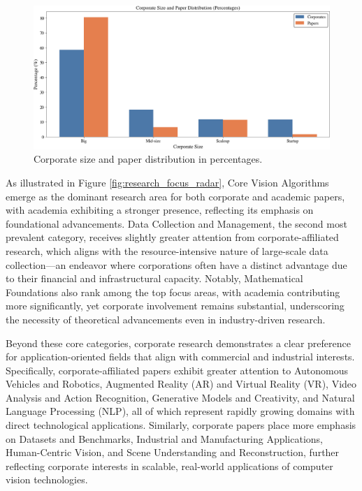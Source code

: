 \documentclass{article}
\begin{document}
\begin{figure}[ht]
  \centering
  \includegraphics[width=\textwidth]{report/images/corporate_paper_distribution.png}  
  \caption{Corporate size and paper distribution in percentages.}
  \label{fig:corporate_size_graph}
\end{figure}

As illustrated in Figure \ref{fig:research_focus_radar}, Core Vision Algorithms emerge as the dominant research area for both corporate and academic papers, with academia exhibiting a stronger presence, reflecting its emphasis on foundational advancements. Data Collection and Management, the second most prevalent category, receives slightly greater attention from corporate-affiliated research, which aligns with the resource-intensive nature of large-scale data collection—an endeavor where corporations often have a distinct advantage due to their financial and infrastructural capacity. Notably, Mathematical Foundations also rank among the top focus areas, with academia contributing more significantly, yet corporate involvement remains substantial, underscoring the necessity of theoretical advancements even in industry-driven research.

Beyond these core categories, corporate research demonstrates a clear preference for application-oriented fields that align with commercial and industrial interests. Specifically, corporate-affiliated papers exhibit greater attention to Autonomous Vehicles and Robotics, Augmented Reality (AR) and Virtual Reality (VR), Video Analysis and Action Recognition, Generative Models and Creativity, and Natural Language Processing (NLP), all of which represent rapidly growing domains with direct technological applications. Similarly, corporate papers place more emphasis on Datasets and Benchmarks, Industrial and Manufacturing Applications, Human-Centric Vision, and Scene Understanding and Reconstruction, further reflecting corporate interests in scalable, real-world applications of computer vision technologies.
\end{document}
